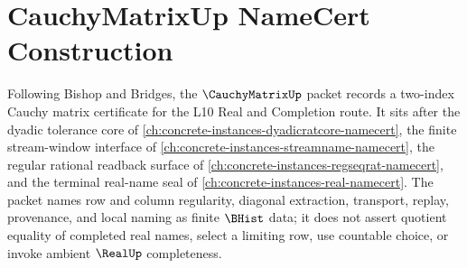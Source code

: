 \chapter{CauchyMatrixUp NameCert Construction}
\label{ch:concrete-instances-cauchy-matrix-namecert}

Following Bishop and Bridges, the $\CauchyMatrixUp$ packet records a two-index Cauchy matrix certificate for the L10 Real and Completion route. It sits after the dyadic tolerance core of \autoref{ch:concrete-instances-dyadicratcore-namecert}, the finite stream-window interface of \autoref{ch:concrete-instances-streamname-namecert}, the regular rational readback surface of \autoref{ch:concrete-instances-regseqrat-namecert}, and the terminal real-name seal of \autoref{ch:concrete-instances-real-namecert}. The packet names row and column regularity, diagonal extraction, transport, replay, provenance, and local naming as finite $\BHist$ data; it does not assert quotient equality of completed real names, select a limiting row, use countable choice, or invoke ambient $\RealUp$ completeness.

